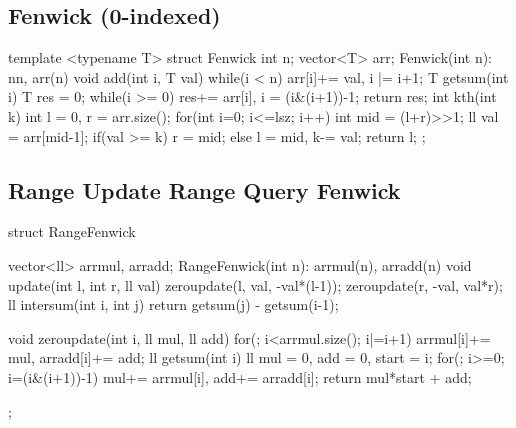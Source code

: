 \subsection{Fenwick (0-indexed)}
\begin{cpp}
template <typename T>
struct Fenwick{
  int n; vector<T> arr;
  Fenwick(int n): n{n}, arr(n) {}
  void add(int i, T val){
    while(i < n) arr[i]+= val, i |= i+1;
  }
  T getsum(int i){
    T res = 0;
    while(i >= 0) res+= arr[i], i = (i&(i+1))-1;
    return res;
  }
  int kth(int k){
    int l = 0, r = arr.size();
    for(int i=0; i<=lsz; i++){
      int mid = (l+r)>>1;
      ll val = arr[mid-1];
      if(val >= k) r = mid;
      else l = mid, k-= val;
    }
    return l;
  }
};
\end{cpp}

\subsection{Range Update Range Query Fenwick}
\begin{cpp}
struct RangeFenwick{
  vector<ll> arrmul, arradd;
  RangeFenwick(int n): arrmul(n), arradd(n){}
  void update(int l, int r, ll val){
    zeroupdate(l, val, -val*(l-1));
    zeroupdate(r, -val, val*r);
  }
  ll intersum(int i, int j){
    return getsum(j) - getsum(i-1);
  }

  void zeroupdate(int i, ll mul, ll add){
    for(; i<arrmul.size(); i|=i+1)
      arrmul[i]+= mul, arradd[i]+= add;
  }
  ll getsum(int i){
    ll mul = 0, add = 0, start = i;
    for(; i>=0; i=(i&(i+1))-1)
      mul+= arrmul[i], add+= arradd[i];
    return mul*start + add;
  }
};
\end{cpp}

